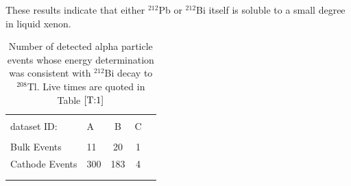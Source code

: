 These results indicate that either $^{212}$Pb or $^{212}$Bi itself is soluble to a small degree in liquid xenon. 



\begin{table}[ht]
\centering
\caption{Number of detected alpha particle events whose energy determination was consistent with $^{212}$Bi decay to $^{208}$Tl. Live times are quoted in Table $\ref{T:1}$}
\begin{tabular}{llccc}
\hline
\\[-5pt]
dataset ID: & A &B & C \\
\hline
\\[-5pt]

Bulk Events & 11 & 20 & 1 \\
Cathode Events & 300 & 183 & 4 \\
\\[-5pt]

\\[-5pt]

\hline
\end{tabular}
\label{T:3}
\end{table}



